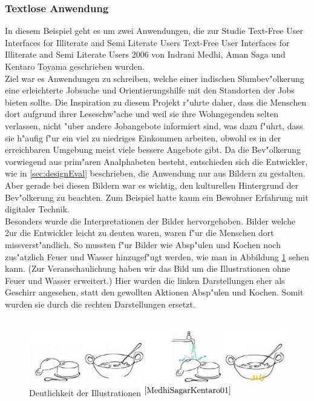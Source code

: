 \newpage
\subsubsection{Textlose Anwendung}\label{sec:beisp3}
In diesem Beispiel geht es um zwei Anwendungen, die zur Studie \glqq Text-Free User Interfaces for Illiterate and Semi Literate Users\grqq{}
					{Text-Free User Interfaces for Illiterate and Semi Literate Users}
					{2006}
					{}
 von Indrani Medhi, Aman Saga und Kentaro Toyama geschrieben wurden.\\
Ziel war es Anwendungen zu schreiben, welche einer indischen Slumbev"olkerung eine erleichterte Jobsuche und Orientierungshilfe mit den Standorten der Jobs bieten sollte. Die Inspiration zu diesem Projekt r"uhrte daher, dass die Menschen dort aufgrund ihrer Leseschw"ache und weil sie ihre Wohngegenden selten verlassen, nicht "uber andere Jobangebote informiert sind, was dazu f"uhrt, dass sie h"aufig f"ur ein viel zu niedriges Einkommen arbeiten, obwohl es in der erreichbaren Umgebung meist viele bessere Angebote gibt. Da die Bev"olkerung vorwiegend aus prim"aren Analphabeten besteht, entschieden sich die Entwickler, wie in  \ref{sec:designEval} beschrieben, die Anwendung nur aus Bildern zu gestalten. Aber gerade bei diesen Bildern war es wichtig, den kulturellen Hintergrund der Bev"olkerung zu beachten. Zum Beispiel hatte kaum ein Bewohner Erfahrung mit digitaler Technik.\\
Besonders wurde die Interpretationen der Bilder hervorgehoben. Bilder welche 2ur die Entwickler leicht zu deuten waren, waren f"ur die Menschen dort missverst"andlich. So mussten f"ur Bilder wie Absp"ulen und Kochen noch zus"atzlich Feuer und Wasser hinzugef"ugt werden, wie man in Abbildung \ref{fig:picfail} sehen kann. (Zur Veranschaulichung haben wir das Bild um die Illustrationen ohne Feuer und Wasser erweitert.) Hier wurden die linken Darstellungen eher als Geschirr angesehen, statt den gewollten Aktionen Absp"ulen und Kochen. Somit wurden sie durch die rechten Darstellungen ersetzt.\\\\

\begin{figure}[h]
	\centering
		\includegraphics[width=1.00\textwidth]{Daten/pic_fail2.PNG}
	\caption{Deutlichkeit der Illustrationen $^{\ref{MedhiSagarKentaro01}}$}
	\label{fig:picfail}
\end{figure}

